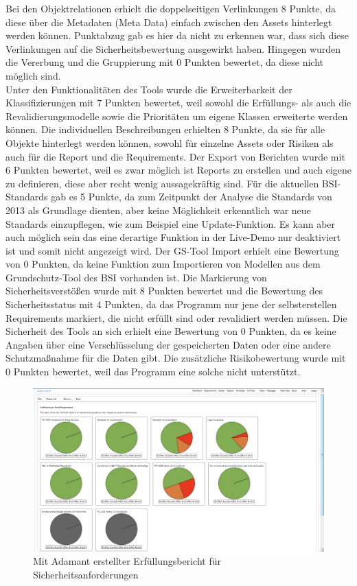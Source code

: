Bei den Objektrelationen erhielt die doppelseitigen Verlinkungen 8 Punkte, da diese über die Metadaten (Meta Data) einfach zwischen den Assets hinterlegt werden können. Punktabzug gab es hier da nicht zu erkennen war, dass sich diese Verlinkungen auf die Sicherheitsbewertung ausgewirkt haben. Hingegen wurden die Vererbung und die Gruppierung mit 0 Punkten bewertet, da diese nicht möglich sind.\\
Unter den Funktionalitäten des Tools wurde die Erweiterbarkeit der Klassifizierungen mit 7 Punkten bewertet, weil sowohl die Erfüllungs- als auch die Revalidierungsmodelle sowie die Prioritäten um eigene Klassen erweiterte werden können. Die individuellen Beschreibungen erhielten 8 Punkte, da sie für alle Objekte hinterlegt werden können, sowohl für einzelne Assets oder Risiken als auch für die Report und die Requirements. Der Export von Berichten wurde mit 6 Punkten bewertet, weil es zwar möglich ist Reports zu erstellen und auch eigene zu definieren, diese aber recht wenig aussagekräftig sind. Für die aktuellen BSI-Standards gab es 5 Punkte, da zum Zeitpunkt der Analyse die Standards von 2013 als Grundlage dienten, aber keine Möglichkeit erkenntlich war neue Standards einzupflegen, wie zum Beispiel eine Update-Funktion. Es kann aber auch möglich sein das eine derartige Funktion in der Live-Demo nur deaktiviert ist und somit nicht angezeigt wird. Der GS-Tool Import erhielt eine Bewertung von 0 Punkten, da keine Funktion zum Importieren von Modellen aus dem Grundschutz-Tool des BSI vorhanden ist. Die Markierung von Sicherheitsverstößen wurde mit 8 Punkten bewertet und die Bewertung des Sicherheitsstatus mit 4 Punkten, da das Programm nur jene der selbsterstellen Requirements markiert, die nicht erfüllt sind oder revalidiert werden müssen. Die Sicherheit des Tools an sich erhielt eine Bewertung von 0 Punkten, da es keine Angaben über eine Verschlüsselung der gespeicherten Daten oder eine andere Schutzmaßnahme für die Daten gibt. Die zusätzliche Risikobewertung wurde mit 0 Punkten bewertet, weil das Programm eine solche nicht unterstützt.\\
\begin{figure}[h!bp]
\label{fig:admantReports}
\includegraphics[scale=0.40]{images/adamant_reports.png} 
\caption{Mit Adamant erstellter Erfüllungsbericht für Sicherheitsanforderungen}
\end{figure}
